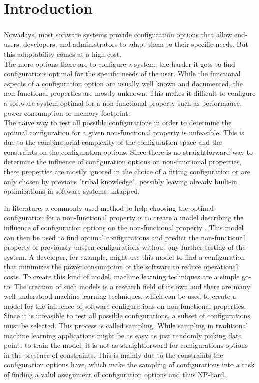 \documentclass[../thesis.tex]{subfiles}
\begin{document}
\chapter{Introduction}
\paragraph{}

Nowadays, most software systems provide configuration options that allow end-users, developers, and administrators
to adapt them to their specific needs. But this adaptability comes at a high cost. \\
The more options there are to configure a system, the harder it gets to find configurations optimal for the specific needs of the user.
While the functional aspects of a configuration option are usually well known and documented, the non-functional properties
are mostly unknown. This makes it difficult to configure a software system optimal for a non-functional property such as performance, power consumption
or memory footprint. \\
The naive way to test all possible configurations in order to determine the optimal configuration for a given non-functional property is unfeasible.
This is due to the combinatorial complexity of the configuration space and the constraints on the configuration options.
Since there is no straightforward way to determine the influence of configuration options on non-functional properties, these properties are mostly
ignored in the choice of a fitting configuration \cite{siegmund2015performance} or are only chosen by previous "tribal knowledge",
possibly leaving already built-in optimizations in software systems untapped.


In literature, a commonly used method to help choosing the optimal configuration for a non-functional property is to create a model describing
the influence of configuration options on the non-functional property \cite{siegmund2015performance}.
This model can then be used to find optimal configurations and predict
the non-functional property of previously unseen configurations without any further testing of the system.
A developer, for example, might use this model to find a configuration
that minimizes the power consumption of the software to reduce operational costs.
To create this kind of model, machine learning techniques are a simple go-to.
The creation of such models is a research field of its own and there are many well-understood machine-learning techniques, which can be used
to create a model for the influence of software configurations on non-functional properties.
Since it is infeasible to test all possible configurations, a subset of configurations must be selected. This process is called sampling.
While sampling in traditional machine learning applications might be as easy as just randomly picking data points to train the model,
it is not as straightforward for configurations options in the presence of constraints.
This is mainly due to the constraints the configuration options have, which make the sampling of configurations into a task of finding
a valid assignment of configuration options and thus NP-hard.
\end{document}
